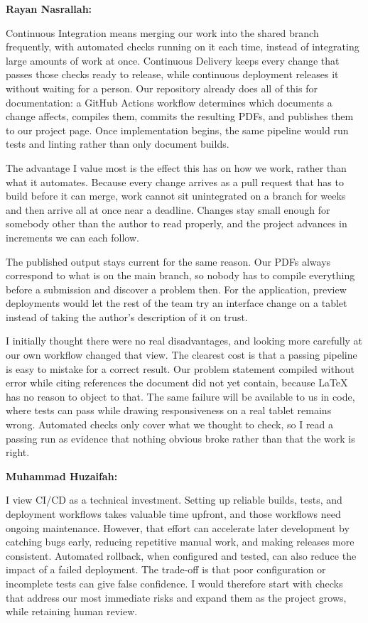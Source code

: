 \documentclass{article}
\begin{document}
\begin{enumerate}
    \textbf{Rayan Nasrallah:}

    Continuous Integration means merging our work into the shared
    branch frequently, with automated checks running on it each
    time, instead of integrating large amounts of work at once.
    Continuous Delivery keeps every change that passes those checks
    ready to release, while continuous deployment releases it
    without waiting for a person. Our repository already does all
    of this for documentation: a GitHub Actions workflow determines
    which documents a change affects, compiles them, commits the
    resulting PDFs, and publishes them to our project page. Once
    implementation begins, the same pipeline would run tests and
    linting rather than only document builds.

    The advantage I value most is the effect this has on how we
    work, rather than what it automates. Because every change
    arrives as a pull request that has to build before it can
    merge, work cannot sit unintegrated on a branch for weeks and
    then arrive all at once near a deadline. Changes stay small
    enough for somebody other than the author to read properly, and
    the project advances in increments we can each follow.

    The published output stays current for the same reason. Our
    PDFs always correspond to what is on the main branch, so nobody
    has to compile everything before a submission and discover a
    problem then. For the application, preview deployments would
    let the rest of the team try an interface change on a tablet
    instead of taking the author's description of it on trust.

    I initially thought there were no real disadvantages, and
    looking more carefully at our own workflow changed that view.
    The clearest cost is that a passing pipeline is easy to mistake
    for a correct result. Our problem statement compiled without
    error while citing references the document did not yet contain,
    because \LaTeX{} has no reason to object to that. The same
    failure will be available to us in code, where tests can pass
    while drawing responsiveness on a real tablet remains wrong.
    Automated checks only cover what we thought to check, so I read
    a passing run as evidence that nothing obvious broke rather
    than that the work is right.

    \textbf{Muhammad Huzaifah:}

    I view CI/CD as a technical investment. Setting up reliable builds,
    tests, and deployment workflows takes valuable time upfront, and those
    workflows need ongoing maintenance. However, that effort can accelerate
    later development by catching bugs early, reducing repetitive manual
    work, and making releases more consistent. Automated rollback, when
    configured and tested, can also reduce the impact of a failed deployment.
    The trade-off is that poor configuration or incomplete tests can give
    false confidence. I would therefore start with checks that address our
    most immediate risks and expand them as the project grows, while
    retaining human review.


\end{enumerate}
\end{document}
